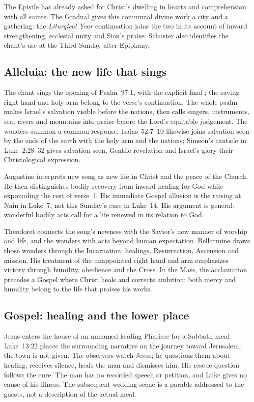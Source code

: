 The Epistle has already asked for Christ's dwelling in hearts and comprehension with all saints. The Gradual gives this communal divine work a city and a gathering: the \textit{Liturgical Year} continuation joins the two in its account of inward strengthening, ecclesial unity and Sion's praise. Schuster also identifies the chant's use at the Third Sunday after Epiphany. 

\subsection*{Alleluia: the new life that sings}
The chant sings the opening of Psalm~97:1, with the explicit final ; the saving right hand and holy arm belong to the verse's continuation. The whole psalm makes Israel's salvation visible before the nations, then calls singers, instruments, sea, rivers and mountains into praise before the Lord's equitable judgement. The wonders summon a common response. Isaias~52:7--10 likewise joins salvation seen by the ends of the earth with the holy arm and the nations; Simeon's canticle in Luke~2:28--32 gives salvation seen, Gentile revelation and Israel's glory their Christological expression.

Augustine interprets new song as new life in Christ and the peace of the Church. He then distinguishes bodily recovery from inward healing for God while expounding the rest of verse~1. His immediate Gospel allusion is the raising at Nain in Luke~7, not this Sunday's cure in Luke~14. His argument is general: wonderful bodily acts call for a life renewed in its relation to God. 

Theodoret connects the song's newness with the Savior's new manner of worship and life, and the wonders with acts beyond human expectation. Bellarmine draws those wonders through the Incarnation, healings, Resurrection, Ascension and mission. His treatment of the unappointed right hand and arm emphasizes victory through humility, obedience and the Cross. In the Mass, the acclamation precedes a Gospel where Christ heals and corrects ambition: both mercy and humility belong to the life that praises his works. 

\subsection*{Gospel: healing and the lower place}
Jesus enters the house of an unnamed leading Pharisee for a Sabbath meal. Luke~13:22 places the surrounding narrative on the journey toward Jerusalem; the town is not given. The observers watch Jesus; he questions them about healing, receives silence, heals the man and dismisses him. His rescue question follows the cure. The man has no recorded speech or petition, and Luke gives no cause of his illness. The subsequent wedding scene is a parable addressed to the guests, not a description of the actual meal. 

